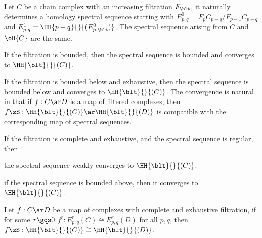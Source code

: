 \documentclass[article, a4paper, twoside]{universal}
\begin{document}
\begin{thm}[5.4.1, 5.4.5, 5.5.1, 5.5.10]
    Let $C$ be a chain complex with an increasing filtration $F_{\blt}$, it naturally determines a homology spectral sequence starting with $E_{p,q}^{0}=F_{p}C_{p+q}/F_{p-1}C_{p+q}$ and $E_{p,q}^{1}=\HH{p+q}{}{(E_{p,\blt}^{0})}$. The spectral sequence arising from $C$ and $\oH{C}$ are the same.

    \begin{itm}
        \item If the filtration is bounded, then the spectral sequence is bounded and converges to $\HH{\blt}{}{(C)}$.
        \item If the filtration is bounded below and exhaustive, then the spectral sequence is bounded below and converges to $\HH{\blt}{}{(C)}$. The convergence is natural in that if $f:C\ar D$ is a map of filtered complexes, then $f\zS:\HH{\blt}{}{(C)}\ar\HH{\blt}{}{(D)}$ is compatible with the corresponding map of spectral sequences.
        \item If the filtration is complete and exhaustive, and the spectral sequence is regular, then
        \begin{itm}
            \item the spectral sequence weakly converges to $\HH{\blt}{}{(C)}$.
            \item if the spectral sequence is bounded above, then it converges to $\HH{\blt}{}{(C)}$.
        \end{itm}
    \end{itm}
\end{thm}

\begin{thm}
    Let $f:C\ar D$ be a map of complexes with complete and exhaustive filtration, if for some $r\gqs0$ $f^{r}:E_{p,q}^{r}(C)\cong E_{p,q}^{r}(D)$ for all $p,q$, then $f\zS:\HH{\blt}{}{(C)}\cong\HH{\blt}{}{(D)}$.
\end{thm}
\end{document}
